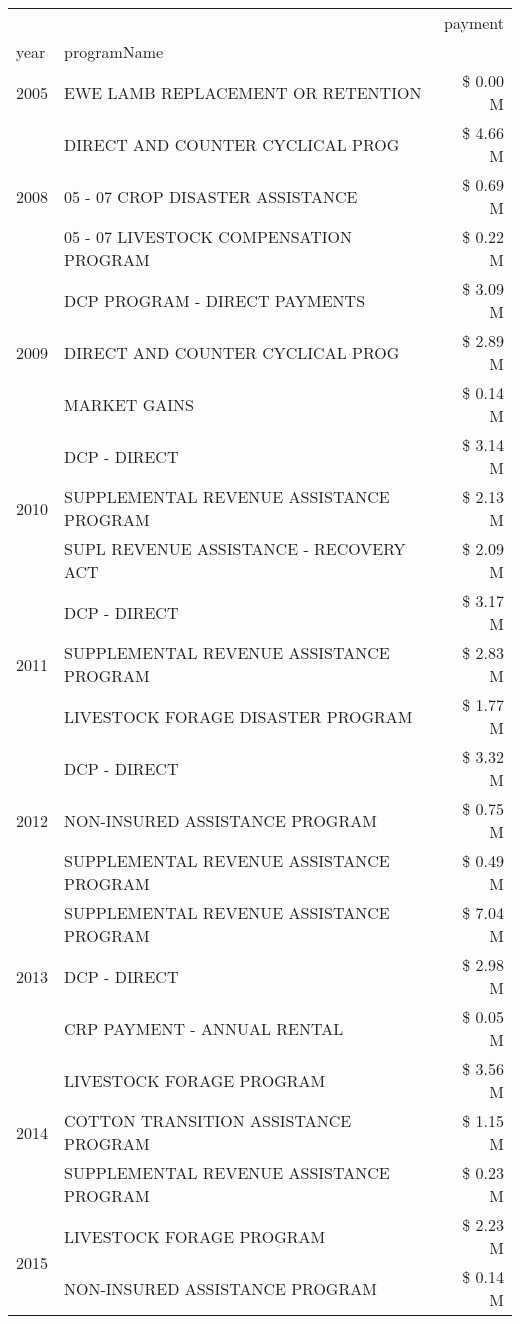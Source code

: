 \begin{tabular}{llr}
\toprule
 &  & payment \\
year & programName &  \\
\midrule
2005 & EWE LAMB REPLACEMENT OR RETENTION & \$ 0.00 M \\
\cline{1-3}
\multirow[t]{3}{*}{2008} & DIRECT AND COUNTER CYCLICAL PROG & \$ 4.66 M \\
 & 05 - 07 CROP DISASTER ASSISTANCE & \$ 0.69 M \\
 & 05 - 07 LIVESTOCK COMPENSATION PROGRAM & \$ 0.22 M \\
\cline{1-3}
\multirow[t]{3}{*}{2009} & DCP PROGRAM - DIRECT PAYMENTS & \$ 3.09 M \\
 & DIRECT AND COUNTER CYCLICAL PROG & \$ 2.89 M \\
 & MARKET GAINS & \$ 0.14 M \\
\cline{1-3}
\multirow[t]{3}{*}{2010} & DCP - DIRECT & \$ 3.14 M \\
 & SUPPLEMENTAL REVENUE ASSISTANCE PROGRAM & \$ 2.13 M \\
 & SUPL REVENUE ASSISTANCE - RECOVERY ACT & \$ 2.09 M \\
\cline{1-3}
\multirow[t]{3}{*}{2011} & DCP - DIRECT & \$ 3.17 M \\
 & SUPPLEMENTAL REVENUE ASSISTANCE PROGRAM & \$ 2.83 M \\
 & LIVESTOCK FORAGE DISASTER PROGRAM & \$ 1.77 M \\
\cline{1-3}
\multirow[t]{3}{*}{2012} & DCP - DIRECT & \$ 3.32 M \\
 & NON-INSURED ASSISTANCE PROGRAM & \$ 0.75 M \\
 & SUPPLEMENTAL REVENUE ASSISTANCE PROGRAM & \$ 0.49 M \\
\cline{1-3}
\multirow[t]{3}{*}{2013} & SUPPLEMENTAL REVENUE ASSISTANCE PROGRAM & \$ 7.04 M \\
 & DCP - DIRECT & \$ 2.98 M \\
 & CRP PAYMENT - ANNUAL RENTAL & \$ 0.05 M \\
\cline{1-3}
\multirow[t]{3}{*}{2014} & LIVESTOCK FORAGE PROGRAM & \$ 3.56 M \\
 & COTTON TRANSITION ASSISTANCE PROGRAM & \$ 1.15 M \\
 & SUPPLEMENTAL REVENUE ASSISTANCE PROGRAM & \$ 0.23 M \\
\cline{1-3}
\multirow[t]{3}{*}{2015} & LIVESTOCK FORAGE PROGRAM & \$ 2.23 M \\
 & NON-INSURED ASSISTANCE PROGRAM & \$ 0.14 M \\

\end{tabular}
